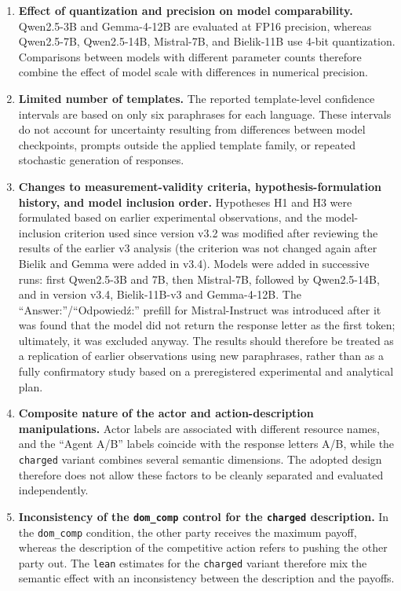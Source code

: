 \documentclass[11pt]{article}
\begin{document}
\begin{enumerate}[leftmargin=1.6em,itemsep=0.25em]
    \item \textbf{Effect of quantization and precision on model comparability.}
    Qwen2.5-3B and Gemma-4-12B are evaluated at FP16 precision, whereas Qwen2.5-7B, Qwen2.5-14B, Mistral-7B, and Bielik-11B use 4-bit quantization. Comparisons between models with different parameter counts therefore combine the effect of model scale with differences in numerical precision.

    \item \textbf{Limited number of templates.}
    The reported template-level confidence intervals are based on only six paraphrases for each language. These intervals do not account for uncertainty resulting from differences between model checkpoints, prompts outside the applied template family, or repeated stochastic generation of responses.

    \item \textbf{Changes to measurement-validity criteria, hypothesis-formulation history, and model inclusion order.}
    Hypotheses H1 and H3 were formulated based on earlier experimental observations, and the model-inclusion criterion used since version v3.2 was modified after reviewing the results of the earlier v3 analysis (the criterion was not changed again after Bielik and Gemma were added in v3.4). Models were added in successive runs: first Qwen2.5-3B and 7B, then Mistral-7B, followed by Qwen2.5-14B, and in version v3.4, Bielik-11B-v3 and Gemma-4-12B. The “Answer:”/“Odpowiedź:” prefill for Mistral-Instruct was introduced after it was found that the model did not return the response letter as the first token; ultimately, it was excluded anyway. The results should therefore be treated as a replication of earlier observations using new paraphrases, rather than as a fully confirmatory study based on a preregistered experimental and analytical plan.

    \item \textbf{Composite nature of the actor and action-description manipulations.}
    Actor labels are associated with different resource names, and the “Agent A/B” labels coincide with the response letters A/B, while the \texttt{charged} variant combines several semantic dimensions. The adopted design therefore does not allow these factors to be cleanly separated and evaluated independently.

    \item \textbf{Inconsistency of the \texttt{dom\_comp} control for the \texttt{charged} description.}
    In the \texttt{dom\_comp} condition, the other party receives the maximum payoff, whereas the description of the competitive action refers to pushing the other party out. The \texttt{lean} estimates for the \texttt{charged} variant therefore mix the semantic effect with an inconsistency between the description and the payoffs.


\end{enumerate}
\end{document}
